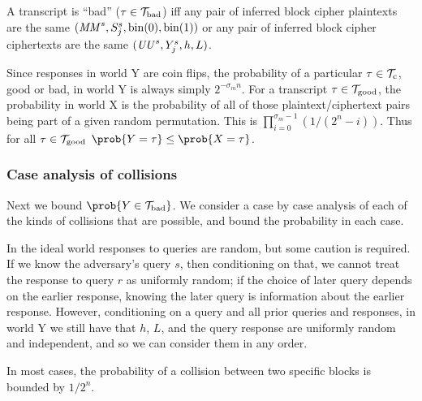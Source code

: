 \documentclass[hctr.tex]{subfiles}
\begin{document}
A transcript is ``bad'' (\(\tau \in \mathcal{T}_\mathrm{bad}\)) iff any pair of 
inferred block cipher plaintexts are the same
\((\mathit{MM}^s, S_j^s, \operatorname{bin}(0), \operatorname{bin}(1))\)
or any pair of inferred block cipher ciphertexts are the same
\((\mathit{UU}^s, Y_j^s, h, L)\).

Since responses in world Y are coin flips,
the probability of a 
particular \(\tau \in \mathcal{T}_\mathrm{c}\), good or bad,
in world Y is always simply \(2^{-\sigma_m n}\).
For a transcript \(\tau \in \mathcal{T}_\mathrm{good}\),
the probability in world X
is the probability of all of those plaintext/ciphertext
pairs being part of a given random permutation.
This is 
\(\prod_{i=0}^{\sigma_m -1}(1/(2^n - i))\).
Thus for all \(\tau \in \mathcal{T}_\mathrm{good}\)
\(\prob{Y = \tau} \leq \prob{X = \tau}\). 

\subsubsection{Case analysis of collisions}
Next we bound \(\prob{Y \in \Tb}\).
We consider a case by case analysis of
each of the kinds of collisions that are
possible, and bound the probability in each case.

In the ideal world responses to queries are random,
but some caution is required.
If we know the adversary's query \(s\), then conditioning on that,
we cannot treat the response to query \(r\) as uniformly random;
if the choice of later query depends on the earlier response,
knowing the later query is information about the earlier response.
However, conditioning on a query and all prior queries and responses,
in world Y we still have that \(h\), \(L\), and the
query response are uniformly random and independent,
and so we can consider them in any order.


In most cases, the probability of a collision
between two specific blocks is bounded by \(1/2^n\).
\end{document}
